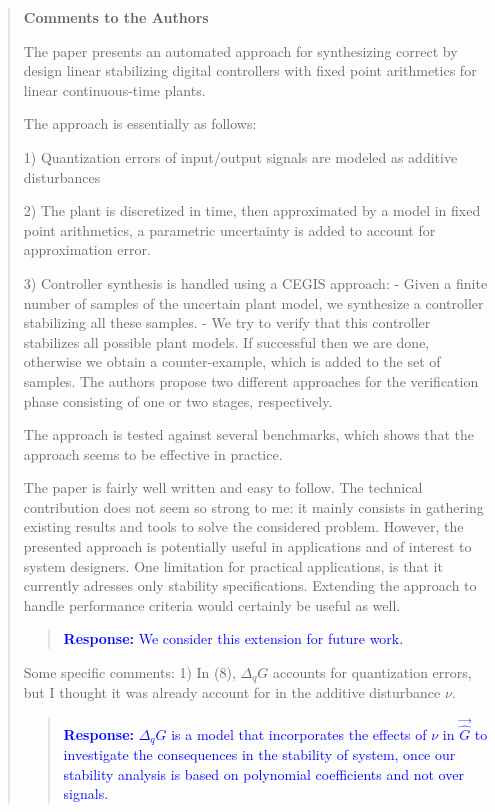 \documentclass[11pt]{article}
\begin{document}
\begin{quote}

{\bf Comments to the Authors}

The paper presents an automated approach for synthesizing correct by design linear stabilizing digital controllers with fixed point arithmetics for linear continuous-time plants. 

The approach is essentially as follows:

1) Quantization errors of input/output signals are modeled as additive disturbances

2) The plant is discretized in time, then approximated by a model in fixed point arithmetics, a parametric uncertainty is added to account for approximation error.

3) Controller synthesis is handled using a CEGIS approach:
    - Given a finite number of samples of the uncertain plant model, we synthesize a controller stabilizing all these samples. 
    - We try to verify that this controller stabilizes all possible plant models. If successful then we are done, otherwise we obtain a counter-example, which is added to the set of samples. The authors propose two different approaches for the verification phase consisting of one or two stages, respectively.

The approach is tested against several benchmarks, which shows that the approach seems to be effective in practice. 

The paper is fairly well written and easy to follow. The technical contribution does not seem so strong to me: it mainly consists in gathering existing results and tools to solve the considered problem. However, the presented approach is potentially useful in applications and of interest to system designers. One limitation for practical applications, is that it currently adresses only stability specifications. Extending the approach to handle performance criteria would certainly be useful as well. 

\begin{quote}
\textcolor{blue}{\textbf{Response:} 
We consider this extension for future work.}
\end{quote}

Some specific comments:
1) In (8), $\Delta_{q} G$ accounts for quantization errors, but I thought it was already account for in the additive disturbance $\nu$.

\begin{quote}
\textcolor{blue}{\textbf{Response:} $\Delta_{q} G$ is a model that incorporates the effects of $\nu$ in $\vec{\hat{G}}$ to investigate the consequences in the stability of system, once our stability analysis is based on polynomial coefficients and not over signals.}
\end{quote}



\end{quote}
\end{document}

